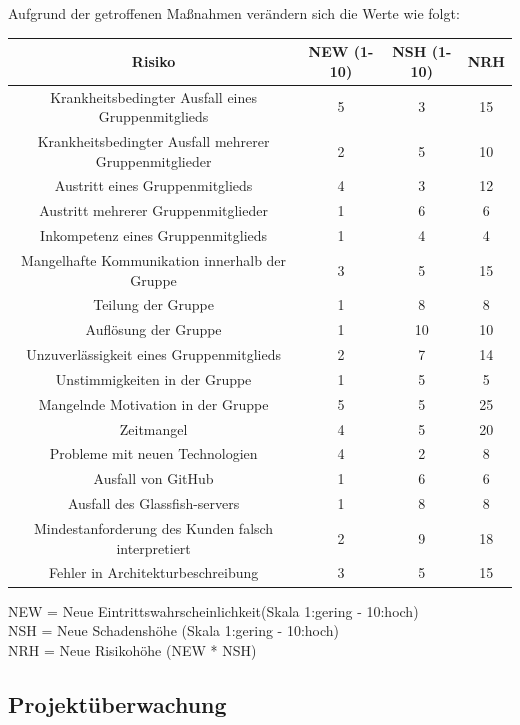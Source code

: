 \documentclass[fontsize=12pt,paper=a4,twoside]{scrartcl}
\begin{document}
Aufgrund der getroffenen Maßnahmen verändern sich die Werte wie folgt:\\
\begin{center}
\begin{tabular}{|c|c|c|c|} \hline
Risiko & NEW (1-10) & NSH (1-10) & NRH\\ \hline
Krankheitsbedingter Ausfall eines Gruppenmitglieds & 5 & 3 & 15\\ \hline
Krankheitsbedingter Ausfall mehrerer Gruppenmitglieder & 2 & 5 & 10\\ \hline
Austritt eines Gruppenmitglieds & 4 & 3 & 12\\ \hline
Austritt mehrerer Gruppenmitglieder & 1 & 6 & 6\\ \hline
Inkompetenz eines Gruppenmitglieds & 1 & 4 & 4\\ \hline
Mangelhafte Kommunikation innerhalb der Gruppe & 3 & 5 & 15\\ \hline
Teilung der Gruppe & 1 & 8 & 8\\ \hline
Auflösung der Gruppe & 1 & 10 & 10\\ \hline
Unzuverlässigkeit eines Gruppenmitglieds & 2 & 7 & 14\\ \hline
Unstimmigkeiten in der Gruppe & 1 & 5 & 5\\ \hline
Mangelnde Motivation in der Gruppe & 5 & 5 & 25\\ \hline
Zeitmangel & 4 & 5 & 20\\ \hline
Probleme mit neuen Technologien & 4 & 2 & 8\\ \hline
Ausfall von GitHub & 1 & 6 & 6\\ \hline
Ausfall des Glassfish-servers & 1 & 8 & 8\\ \hline
Mindestanforderung des Kunden falsch interpretiert & 2 & 9 & 18\\ \hline
Fehler in Architekturbeschreibung & 3 & 5 & 15\\ \hline
\end{tabular}
\end{center}

NEW = Neue Eintrittswahrscheinlichkeit(Skala 1:gering - 10:hoch)\\
NSH = Neue Schadenshöhe (Skala 1:gering - 10:hoch)\\
NRH = Neue Risikohöhe (NEW * NSH)\\



\subsection{Projektüberwachung}\label{3.4-controlling}
\end{document}
